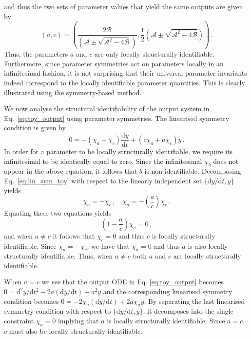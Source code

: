 \documentclass[12pt]{article}
\begin{document}
{\begin{equation}
    \label{eq:quadratic_solution}
  \end{equation}  
   and thus the two sets of parameter values that yield the same outputs are given by
   \begin{equation} 
   (a,c)=\left(\dfrac{2\mathcal{B}}{\left(\mathcal{A}\pm\sqrt{\mathcal{A}^{2}-4\mathcal{B}}\right)},\frac{1}{2}\left(\mathcal{A}\pm\sqrt{\mathcal{A}^{2}-4\mathcal{B}}\right)\right)\,.
     \label{eq:global_parameters}
   \end{equation}
   Thus, the parameters $a$ and $c$ are only locally structurally identifiable. Furthermore, since parameter symmetries act on parameters locally in an infinitesimal fashion, it is not surprising that their universal parameter invariants indeed correspond to the locally identifiable parameter quantities. This is clearly illustrated using the symmetry-based method.

We now analyse the structural identifiability of the output system in Eq.~\eqref{eq:toy_output} using parameter symmetries. The linearised symmetry condition is given by
\begin{equation}
 0=-(\chi_{a}+\chi_{c})\dfrac{\mathrm{d}y}{\mathrm{d}t}+(c\chi_{a}+a\chi_{c})y\,.
 \label{eq:lin_sym_toy}
\end{equation}
In order for a parameter to be locally structurally identifiable, we require its infinitesimal to be identically equal to zero. Since the infinitesimal $\chi_{b}$ does not appear in the above equation, it follows that $b$ is non-identifiable. Decomposing Eq.~\eqref{eq:lin_sym_toy} with respect to the linearly independent set $\{\mathrm{d}y/\mathrm{d}t,y\}$ yields
\begin{equation}
 \chi_{a}=-\chi_{c}\,,\quad\chi_{a}=-\left(\dfrac{a}{c}\right)\chi_{c}\,.
 \label{eq:det_eq_toy}
\end{equation}
Equating these two equations yields
$$\left(1-\dfrac{a}{c}\right)\chi_{c}=0\,,$$
and when $a\neq{c}$ it follows that $\chi_{c}=0$ and thus $c$ is locally structurally identifiable. Since $\chi_{a}=-\chi_{c}$, we have that $\chi_{a}=0$ and thus $a$ is also locally structurally identifiable. Thus, when $a\neq{c}$ both $a$ and $c$ are locally structurally identifiable.

When $a=c$ we see that the output ODE in Eq. \eqref{eq:toy_output} becomes $0=\mathrm{d}^{2}y/\mathrm{d}t^{2}-2a(\mathrm{d}y/\mathrm{d}t)+a^{2}y$  and the corresponding linearised symmetry condition becomes $0=-2\chi_{a}(\mathrm{d}y/\mathrm{d}t)+2a\chi_{a}y$. By separating the last linearised symmetry condition with respect to $\{\mathrm{d}y/\mathrm{d}t,y\}$, it decomposes into the single constraint $\chi_{a}=0$ implying that $a$ is locally structurally identifiable. Since $a=c$, $c$ must also be locally structurally identifiable.

}
\end{document}
